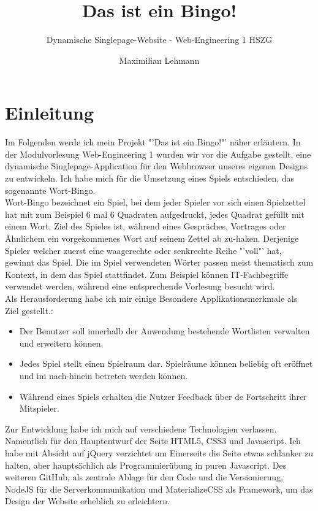 \documentclass[12pt]{scrartcl}
\title{Das ist ein Bingo!}
\subtitle{Dynamische Singlepage-Website - Web-Engineering 1 HSZG}
\author{Maximilian Lehmann}
\begin{document}
\maketitle
\thispagestyle{empty}

\newpage
\thispagestyle{empty}
\tableofcontents
\newpage

\section{Einleitung}

	Im Folgenden werde ich mein Projekt "'Das ist ein Bingo!"' näher erläutern. In der Modulvorlesung Web-Engineering 1 wurden wir vor die Aufgabe gestellt, eine dynamische Singlepage-Application für den Webbrowser unseres eigenen Designs zu entwickeln. Ich habe mich für die Umsetzung eines Spiels entschieden, das sogenannte Wort-Bingo.\\
	
	Wort-Bingo bezeichnet ein Spiel, bei dem jeder Spieler vor sich einen Spielzettel hat mit zum Beispiel 6 mal 6 Quadraten aufgedruckt, jedes Quadrat gefüllt mit einem Wort. Ziel des Spieles ist, während eines Gespräches, Vortrages oder Ähnlichem ein vorgekommenes Wort auf seinem Zettel ab zu-haken. Derjenige Spieler welcher zuerst eine waagerechte oder senkrechte Reihe "'voll"' hat, gewinnt das Spiel. Die im Spiel verwendeten Wörter passen meist thematisch zum Kontext, in dem das Spiel stattfindet. Zum Beispiel können IT-Fachbegriffe verwendet werden, während eine entsprechende Vorlesung besucht wird.\\
	
	Als Herausforderung habe ich mir einige Besondere Applikationsmerkmale als Ziel gestellt.:
	\begin{itemize}
		\item Der Benutzer soll innerhalb der Anwendung bestehende Wortlisten verwalten und erweitern können.
		\item Jedes Spiel stellt einen Spielraum dar. Spielräume können beliebig oft eröffnet und im nach-hinein betreten werden können.
		\item Während eines Spiels erhalten die Nutzer Feedback über de Fortschritt ihrer Mitspieler.
	\end{itemize}
		
	Zur Entwicklung habe ich mich auf verschiedene Technologien verlassen. Namentlich für den Hauptentwurf der Seite HTML5, CSS3 und Javascript. Ich habe mit Absicht auf jQuery verzichtet um Einerseits die Seite etwas schlanker zu halten, aber hauptsächlich als Programmierübung in puren Javascript. Des weiteren GitHub, als zentrale Ablage für den Code und die Versionierung, NodeJS für die Serverkommunikation und MaterializeCSS als Framework, um das Design der Website erheblich zu erleichtern.
\end{document}
